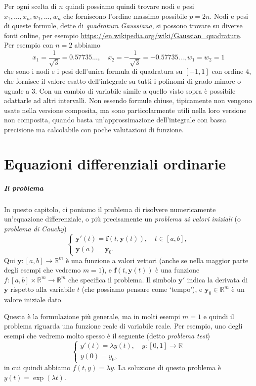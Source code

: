 \documentclass[a4paper]{report}
\theoremstyle{definiton}
\theoremstyle{remark}
\newcommand{\y}{\mathbf{y}}
\newcommand{\f}{\mathbf{f}}
\begin{document}
Per ogni scelta di $n$ quindi possiamo quindi trovare nodi e pesi $x_1,\dots,x_n,w_1,\dots,w_n$ che forniscono l'ordine massimo possibile $p=2n$. Nodi e pesi di queste formule, dette di \emph{quadratura Gaussiana}, si possono trovare su diverse fonti online, per esempio \url{https://en.wikipedia.org/wiki/Gaussian_quadrature}. Per esempio con $n=2$ abbiamo
\[
x_1 = \frac{1}{\sqrt{3}} = 0.57735\dots, \quad x_2 = -\frac{1}{\sqrt{3}} = -0.57735\dots, w_1=w_2=1
\]
che sono i nodi e i pesi dell'unica formula di quadratura su $[-1,1]$ con ordine $4$, che fornisce il valore esatto dell'integrale su tutti i polinomi di grado minore o uguale a $3$. Con un cambio di variabile simile a quello visto sopra è possibile adattarle ad altri intervalli. Non essendo formule chiuse, tipicamente non vengono usate nella versione composita, ma sono particolarmente utili nella loro versione non composita, quando basta un'approssimazione dell'integrale con bassa precisione ma calcolabile con poche valutazioni di funzione.

\chapter{Equazioni differenziali ordinarie}

\paragraph{Il problema} In questo capitolo, ci poniamo il problema di risolvere numericamente un'equazione differenziale, o più precisamente un \emph{problema ai valori iniziali} (o \emph{problema di Cauchy})
\begin{equation} \label{cauchy}
    \begin{cases}
    \y'(t) = \f(t, \y(t)), \quad t \in [a,b],\\
    \y(a) = \y_0.
    \end{cases}
\end{equation}
Qui $\y: [a,b]\to \mathbb{R}^m$ è una funzione a valori vettori (anche se nella maggior parte degli esempi che vedremo $m=1$), e $\f(t,\y(t))$ è una funzione $f:[a,b] \times \mathbb{R}^m \to \mathbb{R}^m$ che specifica il problema. Il simbolo $\y'$ indica la derivata di $\y$ rispetto alla variabile $t$ (che possiamo pensare come `tempo'), e $\y_0\in \mathbb{R}^m$ è un valore iniziale dato.

Questa è la formulazione più generale, ma in molti esempi $m=1$ e quindi il problema riguarda una funzione reale di variabile reale. Per esempio, uno degli esempi che vedremo molto spesso è il seguente (detto \emph{problema test})
\begin{equation} \label{testproblem}
    \begin{cases}
    y'(t) = \lambda y(t), \quad y: [0,1] \to \mathbb{R}\\  
    y(0) = y_0,
    \end{cases}
\end{equation}
in cui quindi abbiamo $f(t, y) = \lambda y$. La soluzione di questo problema è $y(t) = \exp( \lambda t)$.
\end{document}
